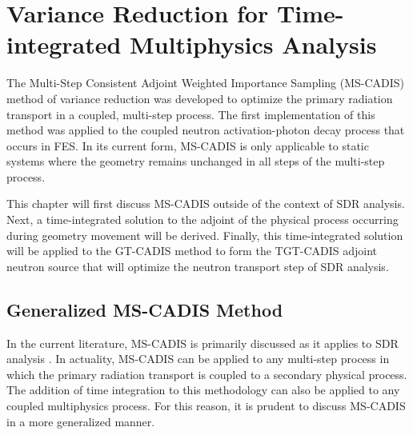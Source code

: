 \chapter{Variance Reduction for Time-integrated Multiphysics Analysis}\label{ch:tgt}

The Multi-Step Consistent Adjoint Weighted Importance Sampling (MS-CADIS)
method of variance reduction 
was developed to optimize the primary radiation transport
in a coupled, multi-step process. The first implementation of this method 
was applied to the coupled neutron activation-photon decay process that occurs
in FES.  
In its current form, MS-CADIS is only applicable to static systems where
the geometry remains unchanged in all steps of the multi-step process.

This chapter will first discuss MS-CADIS outside of the context of SDR analysis. 
Next, a time-integrated solution to the adjoint of the 
physical process occurring during geometry movement will be derived.  
Finally, this time-integrated solution will be applied to the GT-CADIS method to
form the TGT-CADIS adjoint neutron source that will optimize the neutron
transport step of SDR analysis.

\section{Generalized MS-CADIS Method}
In the current literature, MS-CADIS is primarily discussed as it applies to SDR
analysis \cite{mscadis}.  In actuality, MS-CADIS can be applied to any multi-step process in
which the primary radiation transport is coupled to a secondary physical process.
The addition of time integration to this methodology can also be applied to
any coupled multiphysics process. For this reason, it is prudent to discuss
MS-CADIS in a more generalized manner.

